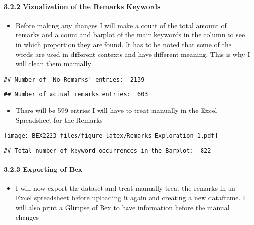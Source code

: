 \documentclass[
]{article}
\providecommand{\tightlist}{%
  \setlength{\itemsep}{0pt}\setlength{\parskip}{0pt}}
\begin{document}
\hypertarget{vizualization-of-the-remarks-keywords}{%
\paragraph{3.2.2 Vizualization of the Remarks
Keywords}\label{vizualization-of-the-remarks-keywords}}

\begin{itemize}
\tightlist
\item
  Before making any changes I will make a count of the total amount of
  remarks and a count and barplot of the main keywords in the column to
  see in which proportion they are found. It has to be noted that some
  of the words are used in different contexts and have different
  meaning. This is why I will clean them manually
\end{itemize}

\begin{verbatim}
## Number of 'No Remarks' entries:  2139
\end{verbatim}

\begin{verbatim}
## Number of actual remarks entries:  603
\end{verbatim}

\begin{itemize}
\tightlist
\item
  There will be 599 entries I will have to treat manually in the Excel
  Spreadsheet for the Remarks
\end{itemize}

\texttt{[image: BEX2223\_files/figure-latex/Remarks Exploration-1.pdf]}

\begin{verbatim}
## Total number of keyword occurrences in the Barplot:  822
\end{verbatim}

\hypertarget{exporting-of-bex}{%
\paragraph{3.2.3 Exporting of Bex}\label{exporting-of-bex}}

\begin{itemize}
\tightlist
\item
  I will now export the dataset and treat manually treat the remarks in
  an Excel spreadsheet before uploading it again and creating a new
  dataframe. I will also print a Glimpse of Bex to have information
  before the manual changes
\end{itemize}
\end{document}
